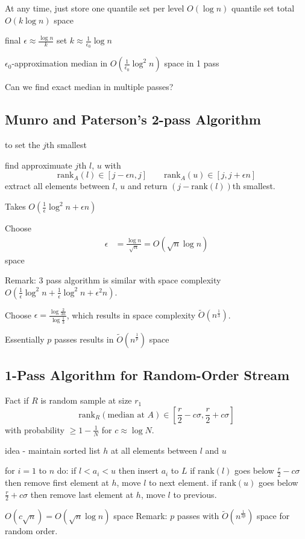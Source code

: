\documentclass[english,12pt]{article}
\theoremstyle{plain}
\theoremstyle{definition}
\theoremstyle{definition} %
\begin{document}
At any time, just store one quantile set per level
$O(\log n)$ quantile set total
$O(k\log n)$ space

final $\epsilon \approx \frac{\log n}{k}$
set $k\approx \frac{1}{\epsilon_0}\log n$

$\epsilon_0$-approximation median in $O\left(\frac{1}{\epsilon_0}\log^2 n\right)$ space in 1 pass

Can we find exact median in multiple passes?

\subsection{Munro and Paterson's 2-pass Algorithm}
to set the $j$th smallest

find approximuate $j$th $l$, $u$ with
\[\text{rank}_A(l)\in[j-\epsilon n, j] \qquad \text{rank}_A(u)\in[j, j+\epsilon n]\]
extract all elements between $l$, $u$ and return $(j-\text{rank}(l))$th smallest.

Takes $O\left(\frac{1}{\epsilon}\log^2 n + \epsilon n\right)$

Choose
\begin{align*}
\epsilon&=\frac{\log n}{\sqrt{n}}
=O(\sqrt{n}\log n)
\end{align*}
space

Remark: 3 pass algorithm is similar with space complexity $O\left(\frac{1}{\epsilon}\log^2 n + \frac{1}{\epsilon}\log^2 n + \epsilon^2 n\right)$.

Choose $\epsilon = \frac{\log \frac{2}{3n}}{\log \frac{1}{3}}$, which results in space complexity $\tilde{O}(n^{\frac{1}{3}})$.

Essentially $p$ passes results in $\tilde{O}(n^{\frac{1}{p}})$ space

\subsection{1-Pass Algorithm for Random-Order Stream}
Fact if $R$ is random sample at size $r_1$
\[\text{rank}_R\left(\text{median at }A\right)\in\left[\frac{r}{2} - c\sigma, \frac{r}{2} + c\sigma\right]\]
with probability $\ge 1-\frac{1}{N}$ for $c\approx\log N$.

idea - maintain sorted list $h$ at all elements between $l$ and $u$

for $i=1$ to $n$ do:
if $l <a_i<u$ then insert $a_i$ to $L$
if $\text{rank}(l)$ goes below $\frac{r}{2}-c\sigma$ then remove first element at $h$, move $l$ to next element.
if $\text{rank}(u)$ goes below $\frac{r}{2}+c\sigma$ then remove last element at $h$, move $l$ to previous.

$O(c\sqrt{n}) = O(\sqrt{n}\log n)$ space
Remark: $p$ passes with $\tilde{O}(n^{\frac{1}{2p}})$ space for random order.
\end{document}
